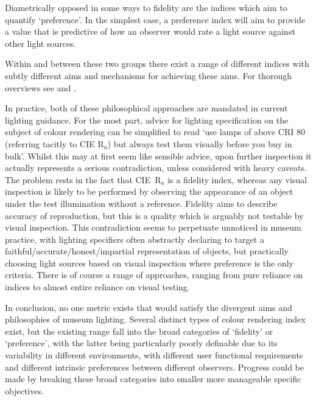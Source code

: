 Diametrically opposed in some ways to fidelity are the indices which aim to quantify `preference'. In the simplest case, a preference index will aim to provide a value that is predictive of how an observer would rate a light source against other light sources. 

Within and between these two groups there exist a range of different indices with subtly different aims and mechanisms for achieving these aims. For thorough overviews see \citet{guo_review_2004} and \citet{houser_review_2013}.

In practice, both of these philosophical approaches are mandated in current lighting guidance. For the most part, advice for lighting specification on the subject of colour rendering can be simplified to read `use lamps of above \gls{CRI} 80 (referring tacitly to \gls{CIE} R$_a$) but always test them visually before you buy in bulk'. Whilst this may at first seem like sensible advice, upon further inspection it actually represents a serious contradiction, unless considered with heavy caveats. The problem rests in the fact that \gls{CIE}~R$_a$ is a fidelity index, whereas any visual inspection is likely to be performed by observing the appearance of an object under the test illumination without a reference. Fidelity aims to describe accuracy of reproduction, but this is a quality which is arguably not testable by visual inspection. This contradiction seems to perpetuate unnoticed in museum practice, with lighting specifiers often abstractly declaring to target a faithful/accurate/honest/impartial representation of objects, but practically choosing light sources based on visual inspection where preference is the only criteria. There is of course a range of approaches, ranging from pure reliance on indices to almost entire reliance on visual testing.

In conclusion, no one metric exists that would satisfy the divergent aims and philosophies of museum lighting. Several distinct types of colour rendering index exist, but the existing range fall into the broad categories of `fidelity' or `preference', with the latter being particularly poorly definable due to its variability in different environments, with different user functional requirements and different intrinsic preferences between different observers. Progress could be made by breaking these broad categories into smaller more manageable specific objectives.



